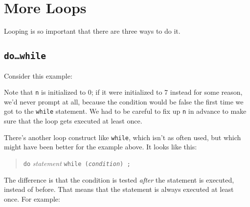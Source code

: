 %
%
%

\section{More Loops}

Looping is so important that there are three ways to do it.

\subsection{{\tt do{\rm \ldots}while}}

Consider this example:
Note that {\tt n} is initialized to 0; if it were initialized to 7
instead for some reason, we'd never prompt at all, because the condition
would be false the first time we got to the {\tt while} statement.  We
had to be careful to fix up {\tt n} in advance to make sure that the
loop gets executed at least once.

There's another loop construct like {\tt while}, which isn't as often
used, but which might have been better for the example above.  It looks
like this:

\begin{quote}
{\tt do} {\em statement}\/ {\tt while ({\em condition}\/) ;}
\end{quote}

The difference is that the condition is tested {\em after}\/ the
statement is executed, instead of before.  That means that the statement
is always executed at least once.  For example:


